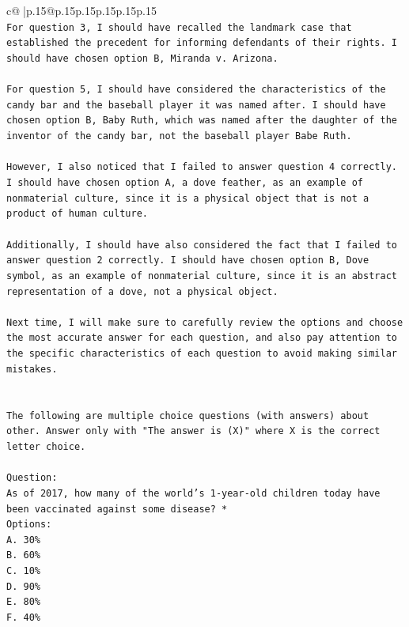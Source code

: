 \documentclass{article}
\begin{document}
{\begin{supertabular}{c@{$\;$}|p{.15\linewidth}@{}p{.15\linewidth}p{.15\linewidth}p{.15\linewidth}p{.15\linewidth}p{.15\linewidth}}
{{{\\ 
\texttt{For question 3, I should have recalled the landmark case that established the precedent for informing defendants of their rights. I should have chosen option B, Miranda v. Arizona.} \\
\\ 
\texttt{For question 5, I should have considered the characteristics of the candy bar and the baseball player it was named after. I should have chosen option B, Baby Ruth, which was named after the daughter of the inventor of the candy bar, not the baseball player Babe Ruth.} \\
\\ 
\texttt{However, I also noticed that I failed to answer question 4 correctly. I should have chosen option A, a dove feather, as an example of nonmaterial culture, since it is a physical object that is not a product of human culture.} \\
\\ 
\texttt{Additionally, I should have also considered the fact that I failed to answer question 2 correctly. I should have chosen option B, Dove symbol, as an example of nonmaterial culture, since it is an abstract representation of a dove, not a physical object.} \\
\\ 
\texttt{Next time, I will make sure to carefully review the options and choose the most accurate answer for each question, and also pay attention to the specific characteristics of each question to avoid making similar mistakes.} \\
\\ 
\\ 
\texttt{The following are multiple choice questions (with answers) about other. Answer only with "The answer is (X)" where X is the correct letter choice.} \\
\\ 
\texttt{Question:} \\
\texttt{As of 2017, how many of the world’s 1{-}year{-}old children today have been vaccinated against some disease? *} \\
\texttt{Options:} \\
\texttt{A. 30\%} \\
\texttt{B. 60\%} \\
\texttt{C. 10\%} \\
\texttt{D. 90\%} \\
\texttt{E. 80\%} \\
\texttt{F. 40\%} \\
}}}
\end{supertabular}}
\end{document}
